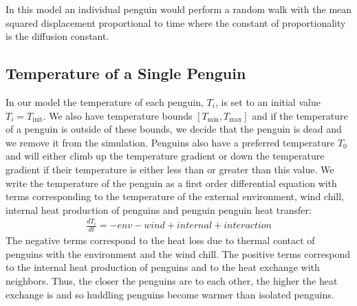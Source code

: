 \documentclass[]{scrartcl}
\begin{document}
In this model an individual penguin would perform a random walk with the mean squared displacement proportional to time where the constant of proportionality is the diffusion constant. 



\subsection{Temperature of a Single Penguin}
In our model the temperature of each penguin, $T_i$, is set to an initial value $T_i = T_{\text{init}}$. We also have temperature bounds $[T_{\min}, T_{\max}]$ and if the temperature of a penguin is outside of these bounds, we decide that the penguin is dead and we remove it from the simulation. Penguins also have a preferred temperature $T_0$ and will either climb up the temperature gradient or down the temperature gradient if their temperature is either less than or greater than this value. We write the temperature of the penguin as a first order differential equation with terms corresponding to the temperature of the external environment, wind chill, internal heat production of penguins and penguin penguin heat transfer:
\begin{align}
\frac{dT_i}{dt} = - env - wind + internal + interaction
\end{align}
The negative terms correspond to the heat loss due to thermal contact of penguins with the environment and the wind chill. The positive terms correspond to the internal heat production of penguins and to the heat exchange with neighbors. Thus, the closer the penguins are to each other, the higher the heat exchange is and so huddling penguins become warmer than isolated penguins. 
\end{document}
